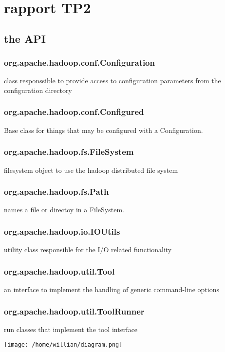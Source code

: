 \documentclass[a4paper]{article}
\author{Willian Ver Valen Paiva}
\date{\today}
\title{}
\begin{document}
\tableofcontents

\section{rapport TP2}
\label{sec:orgheadline13}
\subsection{the API}
\label{sec:orgheadline8}
\subsubsection{org.apache.hadoop.conf.Configuration}
\label{sec:orgheadline1}
class responssible to provide access to configuration parameters from the configuration directory
\subsubsection{org.apache.hadoop.conf.Configured}
\label{sec:orgheadline2}
Base class for things that may be configured with a Configuration.
\subsubsection{org.apache.hadoop.fs.FileSystem}
\label{sec:orgheadline3}
filesystem object to use the hadoop distributed file system
\subsubsection{org.apache.hadoop.fs.Path}
\label{sec:orgheadline4}
names a file or directoy in a FileSystem.
\subsubsection{org.apache.hadoop.io.IOUtils}
\label{sec:orgheadline5}
utility class responsible for the I/O related functionality
\subsubsection{org.apache.hadoop.util.Tool}
\label{sec:orgheadline6}
an interface to implement the handling of generic command-line options
\subsubsection{org.apache.hadoop.util.ToolRunner}
\label{sec:orgheadline7}
run classes that implement the tool interface

\texttt{[image: /home/willian/diagram.png]}
\end{document}
